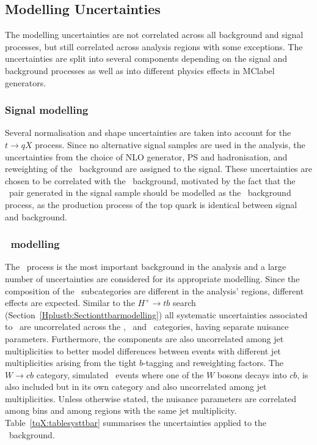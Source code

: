 \subsection{Modelling Uncertainties}
The modelling uncertainties are not correlated across all background and signal processes, but still correlated across analysis regions with some exceptions. The uncertainties are split into several components depending on the signal and background processes as well as into different physics effects in \acrshort{MClabel} generators. 

\subsubsection{Signal modelling}

Several normalisation and shape uncertainties are taken into account for the $t\to qX$ process. Since no alternative signal samples are used in the analysis, the uncertainties from the choice of NLO generator, PS and hadronisation, and reweighting of the \ttl\ background are assigned to the signal. These uncertainties are chosen to be correlated with the \ttl\ background, motivated by the fact that the \ttbar\ pair generated in the signal sample should be modelled as the \ttl\ background process, as the production process of the top quark is identical between signal and background. 

\subsubsection{\ttbar\ modelling}

The \ttbar\ process is the most important background in the analysis and a large number of uncertainties are considered for its appropriate modelling. Since the composition of the \ttbar\ subcategories are different in the analysis' regions, different effects are expected. Similar to the $H^+\to tb$ search (Section~\ref{Hplustb:Sectionttbarmodelling}) all systematic uncertainties associated to \ttbar\ are uncorrelated across the \ttb, \ttc\ and \ttl\ categories, having separate nuisance parameters. Furthermore, the components are also uncorrelated among jet multiplicities to better model differences between events with different jet multiplicities arising from the tight $b$-tagging and reweighting factors. The $W\to cb$ category, simulated \ttbar\ events where one of the $W$ bosons decays into $cb$, is also included but in its own category and also uncorrelated among jet multiplicities. Unless otherwise stated, the nuisance parameters are correlated among bins and among regions with the same jet multiplicity. Table~\ref{tqX:tablesysttbar} summarises the uncertainties applied to the \ttbar\ background. 

